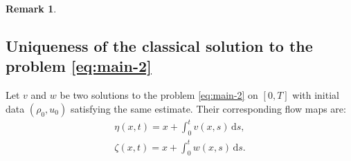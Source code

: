 \documentclass[11pt, reqno]{amsart}
\newcommand{\diff}{\mathrm{d}}
\newtheorem{remark}{Remark}
\numberwithin{equation}{section}
\begin{document}
{\begin{remark}
\end{remark}







\subsection{Uniqueness of the classical solution to the problem \eqref{eq:main-2}}\label{Uniqueness of the classical solution}


Let \(v\) and \(w\) be two solutions to the problem \eqref{eq:main-2} on \([0,T]\) with initial data \((\rho_0,u_0)\) satisfying the same estimate. Their corresponding flow maps are:
\begin{equation*}
	\begin{aligned}
		\eta(x,t)=x+\int_0^tv(x,s)\,\diff s,\\
		\zeta(x,t)=x+\int_0^tw(x,s)\,\diff s.
	\end{aligned}
\end{equation*}


}
\end{document}
